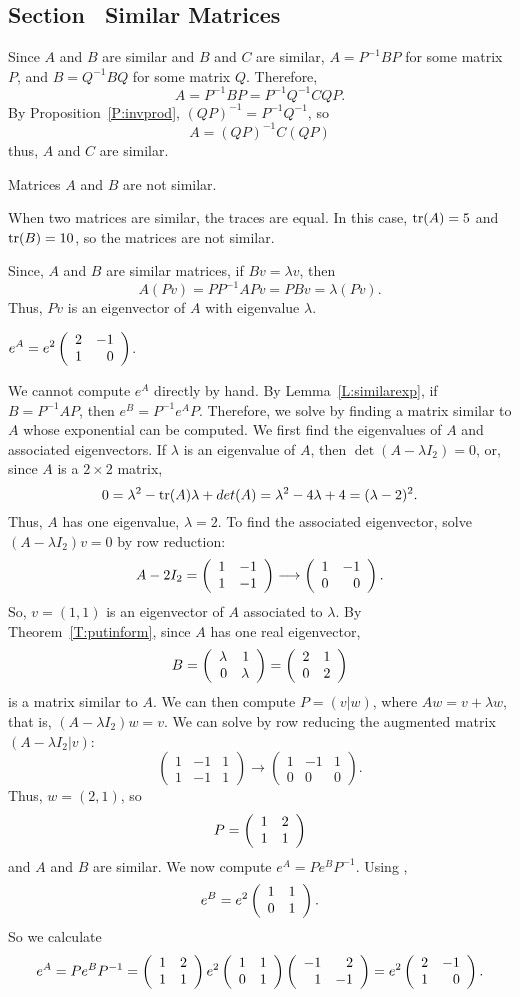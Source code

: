 \subsection*{Section~\protect{\ref{S:6.5}} Similar Matrices}

Since $A$ and $B$ are similar and $B$ and $C$ are similar,
$A = P^{-1}BP$ for some matrix $P$, and $B = Q^{-1}BQ$
for some matrix $Q$.  Therefore,
\[ A = P^{-1}BP = P^{-1}Q^{-1}CQP. \]
By Proposition~\ref{P:invprod}, $(QP)^{-1} = P^{-1}Q^{-1}$, so
\[ A = (QP)^{-1}C(QP) \]
thus, $A$ and $C$ are similar.

\ans Matrices $A$ and $B$ are not similar.

\soln When two matrices are similar, the traces are equal.  In this case,
${\rm tr}(A) = 5$ and ${\rm tr}(B) = 10$, so the matrices are not similar.

Since, $A$ and $B$ are similar matrices, if $Bv = \lambda v$, then
\[ A(Pv) = PP^{-1}APv = PBv = \lambda (Pv). \]
Thus, $Pv$ is an eigenvector of $A$ with eigenvalue $\lambda$.

\ans $\displaystyle e^A = e^2\left(\begin{array}{rr} 2 & -1\\ 1 &0\end{array}\right)$.

\soln We cannot compute $e^A$ directly by hand.  By Lemma~\ref{L:similarexp},
if $B = P^{-1}AP$, then $e^B = P^{-1}e^AP$.  Therefore, we solve by
finding a matrix similar to $A$ whose exponential can be computed.  
We first find the eigenvalues of $A$ and associated eigenvectors.
If $\lambda$ is an eigenvalue of $A$, then $\det(A - \lambda I_2) =
0$, or, since $A$ is a $2 \times 2$ matrix,
\[ 0 = \lambda^2 - {\rm tr}(A)\lambda + det(A) = \lambda^2 - 4\lambda +
4 = (\lambda - 2)^2. \]
Thus, $A$ has one eigenvalue, $\lambda = 2$.  To find the associated
eigenvector, solve $(A - \lambda I_2)v = 0$ by row reduction:
\[ A - 2I_2 = \left(\begin{array}{rr} 1 & -1\\ 1 &-1\end{array}\right) \longrightarrow
\left(\begin{array}{rr} 1 & -1\\ 0 &0\end{array}\right). \]
So, $v = (1,1)$ is an eigenvector of $A$ associated to $\lambda$.
By Theorem~\ref{T:putinform}, since $A$
has one real eigenvector, 
\[ B = \left(\begin{array}{rr} \lambda & 1\\ 0 &\lambda\end{array}\right) = \left(\begin{array}{rr} 2 & 1\\ 0 &2\end{array}\right) \]
is a matrix similar to $A$.  We can then compute $P = (v|w)$, where
$Aw = v + \lambda w$, that is, $(A - \lambda I_2)w = v$.  We can solve
by row reducing the augmented matrix $(A - \lambda I_2|v)$:
\[ \left(\begin{array}{rr|r} 1 & -1 & 1 \\ 1 & -1 & 1 \end{array}
\right) \longrightarrow \left(\begin{array}{rr|r} 1 & -1 & 1 \\
0 & 0 & 0 \end{array}\right). \]
Thus, $w = (2,1)$, so
\[ P = \left(\begin{array}{rr} 1 & 2\\ 1 &1\end{array}\right) \]
and $A$ and $B$ are similar.
We now compute $e^A = Pe^BP^{-1}$.  Using ,
\[ e^B = e^2\left(\begin{array}{rr} 1 & 1\\ 0 &1\end{array}\right). \]
So we calculate 
\[ e^A = Pe^BP^{-1} = \left(\begin{array}{rr} 1 & 2\\ 1 &1\end{array}\right)e^2\left(\begin{array}{rr} 1 & 1\\ 0 &1\end{array}\right)
\left(\begin{array}{rr} -1 & 2\\ 1 &-1\end{array}\right) = e^2\left(\begin{array}{rr} 2 & -1\\ 1 &0\end{array}\right). \]



